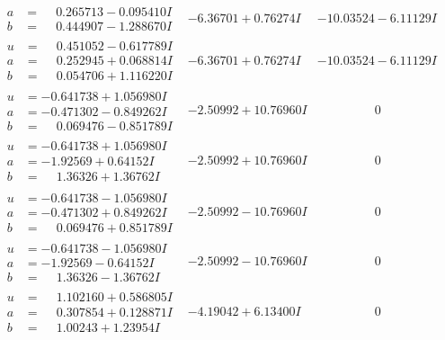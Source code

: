 \documentclass[1p]{elsarticle_modified}
\theoremstyle{definition}
\begin{document}
$$\begin{array}{c|c|c}
\begin{aligned}
a &= \phantom{-}0.265713 - 0.095410 I \\
b &= \phantom{-}0.444907 - 1.288670 I\end{aligned}
 & -6.36701 + 0.76274 I & -10.03524 - 6.11129 I \\ \hline\begin{aligned}
u &= \phantom{-}0.451052 - 0.617789 I \\
a &= \phantom{-}0.252945 + 0.068814 I \\
b &= \phantom{-}0.054706 + 1.116220 I\end{aligned}
 & -6.36701 + 0.76274 I & -10.03524 - 6.11129 I \\ \hline\begin{aligned}
u &= -0.641738 + 1.056980 I \\
a &= -0.471302 - 0.849262 I \\
b &= \phantom{-}0.069476 - 0.851789 I\end{aligned}
 & -2.50992 + 10.76960 I & \phantom{-0.000000 } 0 \\ \hline\begin{aligned}
u &= -0.641738 + 1.056980 I \\
a &= -1.92569 + 0.64152 I \\
b &= \phantom{-}1.36326 + 1.36762 I\end{aligned}
 & -2.50992 + 10.76960 I & \phantom{-0.000000 } 0 \\ \hline\begin{aligned}
u &= -0.641738 - 1.056980 I \\
a &= -0.471302 + 0.849262 I \\
b &= \phantom{-}0.069476 + 0.851789 I\end{aligned}
 & -2.50992 - 10.76960 I & \phantom{-0.000000 } 0 \\ \hline\begin{aligned}
u &= -0.641738 - 1.056980 I \\
a &= -1.92569 - 0.64152 I \\
b &= \phantom{-}1.36326 - 1.36762 I\end{aligned}
 & -2.50992 - 10.76960 I & \phantom{-0.000000 } 0 \\ \hline\begin{aligned}
u &= \phantom{-}1.102160 + 0.586805 I \\
a &= \phantom{-}0.307854 + 0.128871 I \\
b &= \phantom{-}1.00243 + 1.23954 I\end{aligned}
 & -4.19042 + 6.13400 I & \phantom{-0.000000 } 0 \\ \hline\begin{aligned}

\end{aligned}
\end{array}$$
\end{document}
